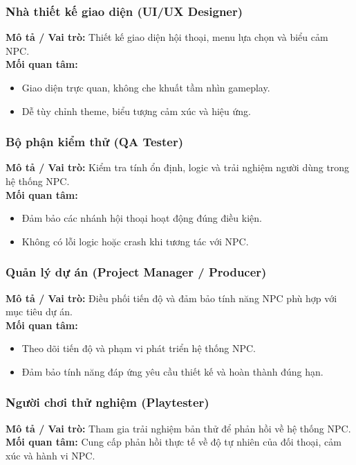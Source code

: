 \subsubsection{Nhà thiết kế giao diện (UI/UX Designer)}
\textbf{Mô tả / Vai trò:} Thiết kế giao diện hội thoại, menu lựa chọn và biểu cảm NPC. \\
\textbf{Mối quan tâm:}
\begin{itemize}
    \item Giao diện trực quan, không che khuất tầm nhìn gameplay.
    \item Dễ tùy chỉnh theme, biểu tượng cảm xúc và hiệu ứng.
\end{itemize}

\subsubsection{Bộ phận kiểm thử (QA Tester)}
\textbf{Mô tả / Vai trò:} Kiểm tra tính ổn định, logic và trải nghiệm người dùng trong hệ thống NPC. \\
\textbf{Mối quan tâm:}
\begin{itemize}
    \item Đảm bảo các nhánh hội thoại hoạt động đúng điều kiện.
    \item Không có lỗi logic hoặc crash khi tương tác với NPC.
\end{itemize}

\subsubsection{Quản lý dự án (Project Manager / Producer)}
\textbf{Mô tả / Vai trò:} Điều phối tiến độ và đảm bảo tính năng NPC phù hợp với mục tiêu dự án. \\
\textbf{Mối quan tâm:}
\begin{itemize}
    \item Theo dõi tiến độ và phạm vi phát triển hệ thống NPC.
    \item Đảm bảo tính năng đáp ứng yêu cầu thiết kế và hoàn thành đúng hạn.
\end{itemize}

\subsubsection{Người chơi thử nghiệm (Playtester)}
\textbf{Mô tả / Vai trò:} Tham gia trải nghiệm bản thử để phản hồi về hệ thống NPC. \\
\textbf{Mối quan tâm:}
Cung cấp phản hồi thực tế về độ tự nhiên của đối thoại, cảm xúc và hành vi NPC.
